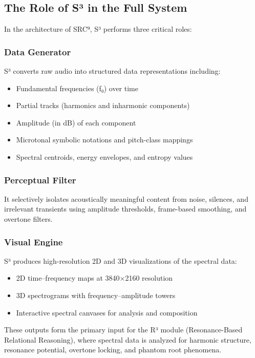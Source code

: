 \subsection*{The Role of S³ in the Full System}

In the architecture of SRC⁹, S³ performs three critical roles:

\subsubsection*{Data Generator}

S³ converts raw audio into structured data representations including:

\begin{itemize}
    \item Fundamental frequencies (f₀) over time
    \item Partial tracks (harmonics and inharmonic components)
    \item Amplitude (in dB) of each component
    \item Microtonal symbolic notations and pitch-class mappings
    \item Spectral centroids, energy envelopes, and entropy values
\end{itemize}

\subsubsection*{Perceptual Filter}

It selectively isolates acoustically meaningful content from noise, silences, and irrelevant transients using amplitude thresholds, frame-based smoothing, and overtone filters.

\subsubsection*{Visual Engine}

S³ produces high-resolution 2D and 3D visualizations of the spectral data:

\begin{itemize}
    \item 2D time–frequency maps at 3840×2160 resolution
    \item 3D spectrograms with frequency–amplitude towers
    \item Interactive spectral canvases for analysis and composition
\end{itemize}

These outputs form the primary input for the R³ module (Resonance-Based Relational Reasoning), where spectral data is analyzed for harmonic structure, resonance potential, overtone locking, and phantom root phenomena.

